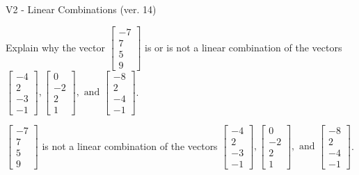\begin{exercise}
  \begin{exerciseTitle}V2 - Linear Combinations (ver. 14)\end{exerciseTitle}
  \begin{exerciseStatement}
    Explain why the vector \(\left[\begin{array}{c}
-7 \\
7 \\
5 \\
9
\end{array}\right]\)  is or is not a linear 
	combination of the vectors \(\left[\begin{array}{c}
-4 \\
2 \\
-3 \\
-1
\end{array}\right] , \left[\begin{array}{c}
0 \\
-2 \\
2 \\
1
\end{array}\right] , \text{ and } \left[\begin{array}{c}
-8 \\
2 \\
-4 \\
-1
\end{array}\right]\).
	


  \end{exerciseStatement}
  \begin{exerciseAnswer}
   \(\left[\begin{array}{c}
-7 \\
7 \\
5 \\
9
\end{array}\right]\) 
  	 is not  
	a linear combination of the vectors \(\left[\begin{array}{c}
-4 \\
2 \\
-3 \\
-1
\end{array}\right] , \left[\begin{array}{c}
0 \\
-2 \\
2 \\
1
\end{array}\right] , \text{ and } \left[\begin{array}{c}
-8 \\
2 \\
-4 \\
-1
\end{array}\right]\).

	
  


  \end{exerciseAnswer}
\end{exercise}